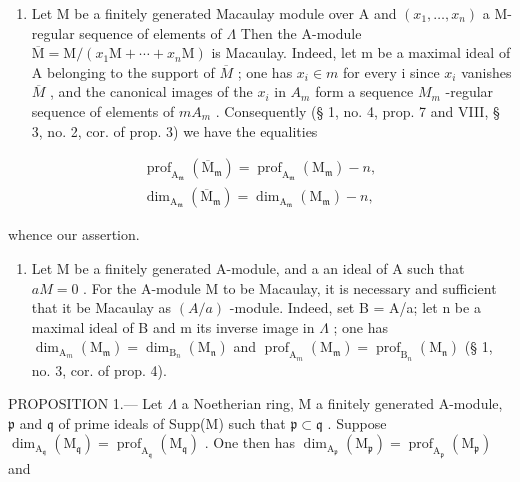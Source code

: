 \begin{enumerate}
\def\labelenumi{\arabic{enumi})}
\setcounter{enumi}{2}
\tightlist
\item
  Let M be a finitely generated Macaulay module over A and \((x_{1},\ldots,x_{n})\) a M-regular sequence of elements of \(\Lambda\) Then the A-module \(\overline{\mathrm{M}}=\mathrm{M}/(x_{1}\mathrm{M}+\cdots+x_{n}\mathrm{M})\) is Macaulay. Indeed, let m be a maximal ideal of A belonging to the support of \(\overline{M}\) ; one has \(x_{i}\in m\) for every i since \(x_{i}\) vanishes \(\overline{M}\) , and the canonical images of the \(x_{i}\) in \(A_{m}\) form a sequence \(M_{m}\) -regular sequence of elements of \(mA_{m}\) . Consequently (§ 1, no. 4, prop. 7 and VIII, § 3, no. 2, cor. of prop. 3) we have the equalities
\end{enumerate}

\[
\begin{array}{l} \operatorname{prof} _ {\mathrm{A} _ {\mathfrak {m}}} (\overline {{\mathrm{M}}} _ {\mathfrak {m}}) = \operatorname{prof} _ {\mathrm{A} _ {\mathfrak {m}}} (\mathrm{M} _ {\mathfrak {m}}) - n, \\ \dim_ {\mathrm{A} _ {\mathfrak {m}}} (\overline {{\mathrm{M}}} _ {\mathfrak {m}}) = \dim_ {\mathrm{A} _ {\mathfrak {m}}} (\mathrm{M} _ {\mathfrak {m}}) - n, \end{array}
\]

whence our assertion.

\begin{enumerate}
\def\labelenumi{\arabic{enumi})}
\setcounter{enumi}{3}
\tightlist
\item
  Let M be a finitely generated A-module, and a an ideal of A such that \(aM = 0\) . For the A-module M to be Macaulay, it is necessary and sufficient that it be Macaulay as \((A/a)\) -module. Indeed, set B = A/a; let n be a maximal ideal of B and m its inverse image in \(\Lambda\) ; one has \(\dim_{\mathrm{A}_{m}}(\mathrm{M}_{\mathfrak{m}}) = \dim_{\mathrm{B}_{n}}(\mathrm{M}_{\mathfrak{n}})\) and \(\operatorname{prof}_{\mathrm{A}_{m}}(\mathrm{M}_{\mathfrak{m}}) = \operatorname{prof}_{\mathrm{B}_{n}}(\mathrm{M}_{\mathfrak{n}})\) (§ 1, no. 3, cor. of prop. 4).
\end{enumerate}

PROPOSITION 1.--- Let \(\Lambda\) a Noetherian ring, M a finitely generated A-module, \(\mathfrak{p}\) and \(\mathfrak{q}\) of prime ideals of Supp(M) such that \(\mathfrak{p} \subset \mathfrak{q}\) . Suppose \(\dim_{\mathrm{A}_{\mathfrak{q}}}(\mathrm{M}_{\mathfrak{q}}) = \operatorname{prof}_{\mathrm{A}_{\mathfrak{q}}}(\mathrm{M}_{\mathfrak{q}})\) . One then has \(\dim_{\mathrm{A}_{\mathfrak{p}}}(\mathrm{M}_{\mathfrak{p}}) = \operatorname{prof}_{\mathrm{A}_{\mathfrak{p}}}(\mathrm{M}_{\mathfrak{p}})\) and

